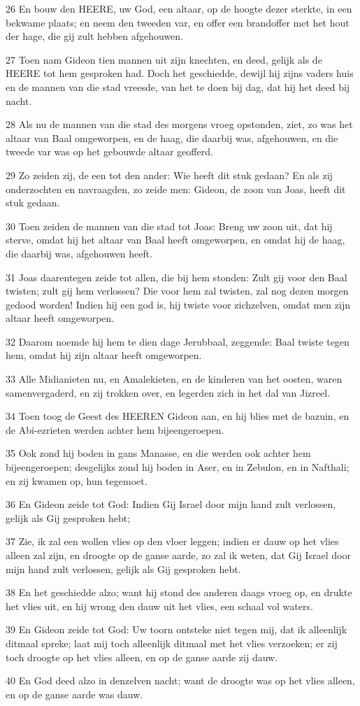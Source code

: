 \par 26 En bouw den HEERE, uw God, een altaar, op de hoogte dezer sterkte, in een bekwame plaats; en neem den tweeden var, en offer een brandoffer met het hout der hage, die gij zult hebben afgehouwen.
\par 27 Toen nam Gideon tien mannen uit zijn knechten, en deed, gelijk als de HEERE tot hem gesproken had. Doch het geschiedde, dewijl hij zijns vaders huis en de mannen van die stad vreesde, van het te doen bij dag, dat hij het deed bij nacht.
\par 28 Als nu de mannen van die stad des morgens vroeg opstonden, ziet, zo was het altaar van Baal omgeworpen, en de haag, die daarbij was, afgehouwen, en die tweede var was op het gebouwde altaar geofferd.
\par 29 Zo zeiden zij, de een tot den ander: Wie heeft dit stuk gedaan? En als zij onderzochten en navraagden, zo zeide men: Gideon, de zoon van Joas, heeft dit stuk gedaan.
\par 30 Toen zeiden de mannen van die stad tot Joas: Breng uw zoon uit, dat hij sterve, omdat hij het altaar van Baal heeft omgeworpen, en omdat hij de haag, die daarbij was, afgehouwen heeft.
\par 31 Joas daarentegen zeide tot allen, die bij hem stonden: Zult gij voor den Baal twisten; zult gij hem verlossen? Die voor hem zal twisten, zal nog dezen morgen gedood worden! Indien hij een god is, hij twiste voor zichzelven, omdat men zijn altaar heeft omgeworpen.
\par 32 Daarom noemde hij hem te dien dage Jerubbaal, zeggende: Baal twiste tegen hem, omdat hij zijn altaar heeft omgeworpen.
\par 33 Alle Midianieten nu, en Amalekieten, en de kinderen van het oosten, waren samenvergaderd, en zij trokken over, en legerden zich in het dal van Jizreel.
\par 34 Toen toog de Geest des HEEREN Gideon aan, en hij blies met de bazuin, en de Abi-ezrieten werden achter hem bijeengeroepen.
\par 35 Ook zond hij boden in gans Manasse, en die werden ook achter hem bijeengeroepen; desgelijks zond hij boden in Aser, en in Zebulon, en in Nafthali; en zij kwamen op, hun tegemoet.
\par 36 En Gideon zeide tot God: Indien Gij Israel door mijn hand zult verlossen, gelijk als Gij gesproken hebt;
\par 37 Zie, ik zal een wollen vlies op den vloer leggen; indien er dauw op het vlies alleen zal zijn, en droogte op de ganse aarde, zo zal ik weten, dat Gij Israel door mijn hand zult verlossen, gelijk als Gij gesproken hebt.
\par 38 En het geschiedde alzo; want hij stond des anderen daags vroeg op, en drukte het vlies uit, en hij wrong den dauw uit het vlies, een schaal vol waters.
\par 39 En Gideon zeide tot God: Uw toorn ontsteke niet tegen mij, dat ik alleenlijk ditmaal spreke; laat mij toch alleenlijk ditmaal met het vlies verzoeken; er zij toch droogte op het vlies alleen, en op de ganse aarde zij dauw.
\par 40 En God deed alzo in denzelven nacht; want de droogte was op het vlies alleen, en op de ganse aarde was dauw.

